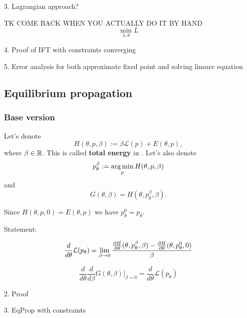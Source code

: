 \documentclass[a4paper,10pt]{report}
\begin{document}
3. Lagrangian approach?

TK COME BACK WHEN YOU ACTUALLY DO IT BY HAND
 \begin{equation}
\min_{\lambda,\theta} L
 \end{equation}

4. Proof of IFT with constraints converging

5. Error analysis for both approximate fixed point and solving lineare equation
\subsection{ Equilibrium propagation}

\subsubsection{Base version}

Let's denote
\begin{equation}
H(\theta, p, \beta) := \beta \mathcal{L}(p) + E(\theta, p),
\end{equation}
where $\beta \in \mathbb{R}$.
 This is called \textbf{total energy} in \cite{eqprop}. Let's also denote
\begin{equation}
p_{\theta}^{\beta}:=\operatorname*{arg\,min}_p H(\theta, p, \beta)
\end{equation}
and
\begin{equation}
 G(\theta, \beta) = H(\theta, p_\theta^\beta, \beta).
\end{equation}

Since $H(\theta,p,0) = E(\theta,p)$ we have $p_{\theta}^{0}=p_{\theta}$.

Statement:

\begin{equation}
 \frac{d}{d\theta} \mathcal{L}(p_\theta) = \lim_{\beta \to 0} \frac{\frac{\partial H}{\partial \theta}(\theta, p_\theta^\beta, \beta)-\frac{\partial H}{\partial \theta}(\theta, p_\theta^0, 0) }{\beta}
\end{equation}



\begin{equation}
 \frac{d}{d\theta}\frac{d}{d\beta}G(\theta,\beta)\big|_{\beta=0} = \frac{d}{d\theta} \mathcal{L}(p_\theta)
\end{equation}






2. Proof

3. EqProp with constraints
\end{document}
